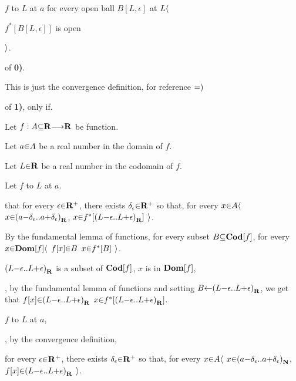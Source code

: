    $f$  to $L$ at $a$  for every open ball $B[L,\epsilon]$ at $L \a\langle$ \par
      \hs\hs\hs $f^*[B[L,\epsilon]]$ is open \par
    \hs\hs $\a\rangle$. \par

\vs
{} of {\bf 0)}. \par
This is just the convergence definition, for reference $\p{=)}$

\vs
{} of {\bf 1)}, only if. \par
Let $f: A\p\subseteq\R \to \R$ be function. \par
Let $a \p\in A$  be a real number in the domain   of $f$. \par
Let $L \p\in \R$ be a real number in the codomain of $f$. \par
Let $f$  to $L$ at $a$. \par
{} that for every $\epsilon \p\in \R^+$, there exists $\delta_\epsilon \p\in \R^+$ so that, for every $x \p\in A \a\langle$  $x \p\in \a(a\p-\delta_\epsilon \a{..} a\p+\delta_\epsilon\a)_\R$,  $x \p\in f^*[\a(L\p-\epsilon \a{..} L\p+\epsilon\a)_\R]$ $\a\rangle$. \par

  \vs
  \hs By the fundamental lemma of functions, for every subset $B \p\subseteq {\bf Cod}[f]$, for every $x \p\in {\bf Dom}[f] \a\langle$ $f[x] \p\in B$  $x \p\in f^*[B]$ $\a\rangle$. \par
  \hs {} $\a(L\p-\epsilon \a{..} L\p+\epsilon\a)_\R$ is a subset of ${\bf Cod}[f]$,  $x$ is in ${\bf Dom}[f]$, \par
  \hs {}, by the fundamental lemma of functions and setting $B \p\leftarrow \a(L\p-\epsilon \a{..} L\p+\epsilon\a)_\R$, we get that $f[x] \p\in \a(L\p-\epsilon \a{..} L\p+\epsilon\a)_\R$  $x \p\in f^*[\a(L\p-\epsilon \a{..} L\p+\epsilon\a)_\R]$. \par

  \vs
  \hs {} $f$  to $L$ at $a$, \par
  \hs {}, by the convergence definition, \par
  \hs for every $\epsilon \p\in \R^+$, there exists $\delta_\epsilon \p\in \R^+$ so that, for every $x \p\in A \a\langle$  $x \p\in \a(a\p-\delta_\epsilon \a{..} a\p+\delta_\epsilon\a)_\N$,  $f[x] \p\in \a(L\p-\epsilon \a{..} L\p+\epsilon\a)_\R$ $\a\rangle$. \par

